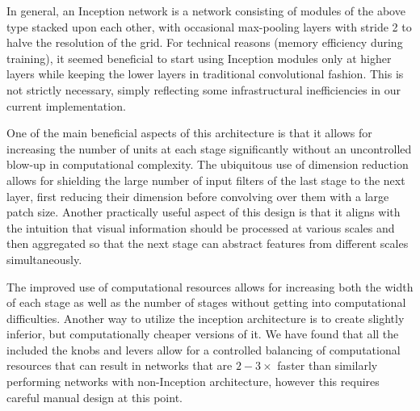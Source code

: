 In general, an Inception network is a network consisting of modules of the above type stacked upon each other, with occasional max-pooling layers with stride 2 to halve the resolution of the grid. For technical reasons (memory efficiency during training), it seemed beneficial to start using Inception modules only at higher layers while keeping the lower layers in traditional convolutional fashion. This is not strictly necessary, simply reflecting some infrastructural inefficiencies in our current implementation.

One of the main beneficial aspects of this architecture is that it allows for increasing the number of units at each stage significantly without an uncontrolled blow-up in computational complexity. The ubiquitous use of dimension reduction allows for shielding the large number of input filters of the last stage to the next layer, first reducing their dimension before convolving over them with a large patch size. Another practically useful aspect of this design is that it aligns with the intuition that visual information should be processed at various scales and then aggregated so that the next stage can abstract features from different scales simultaneously.

The improved use of computational resources allows for increasing both the width of each stage as well as the number of stages without getting into computational difficulties. Another way to utilize the inception architecture is to create slightly inferior, but computationally cheaper versions of it. We have found that all the included the knobs and levers allow for a controlled balancing of computational resources that can result in networks that are $2-3{\times}$ faster than similarly performing networks with non-Inception architecture, however this requires careful manual design at this point.
